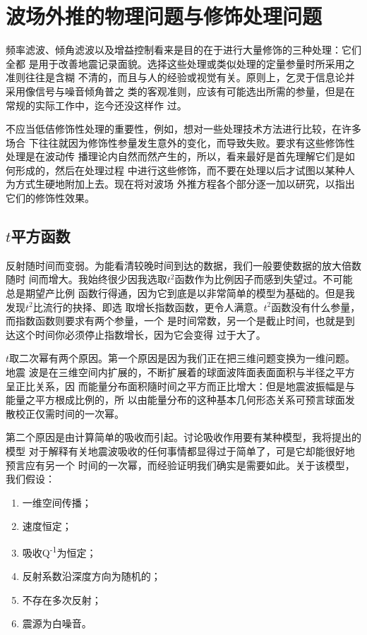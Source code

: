 \section{波场外推的物理问题与修饰处理问题}
\label{sec:4.1}

频率滤波、倾角滤波以及增益控制看来是目的在于进行大量修饰的三种处理：它们全都
是用于改善地震记录面貌。选择这些处理或类似处理的定量参量时所采用之准则往往是含糊
不清的，而且与人的经验或视觉有关。原则上，乞灵于信息论并采用像信号与噪音倾角普之
类的客观准则，应该有可能选出所需的参量，但是在常规的实际工作中，迄今还没这样作
过。

不应当低佶修饰性处理的重要性，例如，想对一些处理技术方法进行比较，在许多场合
下往往就因为修饰性参量发生意外的变化，而导致失败。要求有这些修饰性处理是在波动传
播理论内自然而然产生的，所以，看来最好是首先理解它们是如何形成的，然后在处理过程
中进行这些修饰，而不要在处理以后才试图以某种人为方式生硬地附加上去。现在将对波场
外推方程各个部分逐一加以研究，以指出它们的修饰性效果。



\subsection{$t$平方函数}
\label{sec:4.1.1}

反射随时间而变弱。为能看清较晚时间到达的数据，我们一般要使数据的放大倍数随时
间而增大。我始终很少因我选取$t^2$函数作为比例因子而感到失望过。不可能总是期望产比例
函数行得通，因为它到底是以非常简单的模型为基础的。但是我发现$t^2$比流行的抉择、即选
取增长指数函数，更令人满意。$t^2$函数没有什么参量，而指数函数则要求有两个参量，一个
是时间常数，另一个是截止时间，也就是到达这个时间你必须停止指数增长，因为它会变得
过于大了。

$t$取二次幂有两个原因。第一个原因是因为我们正在把三维问题变换为一维问题。地震
波是在三维空间内扩展的，不断扩展着的球面波阵面表面面积与半径之平方呈正比关系，因
而能量分布面积隨时间之平方而正比增大：但是地震波振幅是与能量之平方根成比例的，所
以由能量分布的这种基本几何形态关系可预言球面发散校正仅需时间的一次幂。

第二个原因是由计算简单的吸收而引起。讨论吸收作用要有某种模型，我将提出的模型
对于解释有关地震波吸收的任何事情都显得过于简单了，可是它却能很好地预言应有另一个
时间的一次幂，而经验证明我们确实是需要如此。关于该模型，我们假设：
\begin{enumerate}

\item
  一维空间传播；
\item
  速度恒定；
\item
  吸收Q\textsuperscript{-1}为恒定；
\item
  反射系数沿深度方向为随机的；
\item
  不存在多次反射；
\item
  震源为白噪音。
\end{enumerate}

